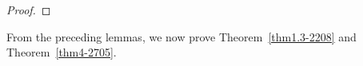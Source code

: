 \documentclass[10pt]{amsart}
\numberwithin{equation}{section}
\begin{document}
\begin{proof}
%
% 
 \end{proof} 

From the preceding lemmas, we now prove Theorem~\ref{thm1.3-2208} and Theorem~\ref{thm4-2705}.
\end{document}

